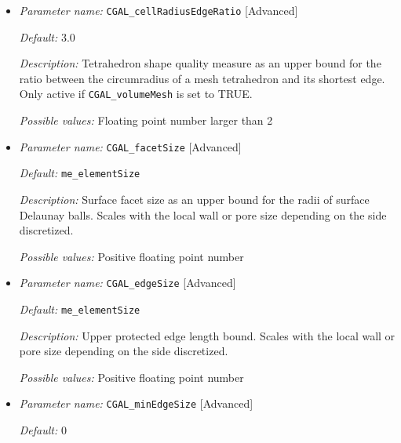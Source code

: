 \begin{itemize}[itemsep=0.8em, parsep=0.3em]
	\item {\it Parameter name:} {\tt CGAL\_cellRadiusEdgeRatio} \hfill [Advanced]
	\label{parameters:me_cellRadiusEdgeRatio}
	
	
	{\it Default:} 3.0
	
	{\it Description:} Tetrahedron shape quality measure as an upper bound for the ratio between the circumradius of a mesh tetrahedron and its shortest edge. Only active if {\tt  CGAL\_volumeMesh} is set to TRUE.
	
	{\it Possible values:} Floating point number larger than 2
	
	\item {\it Parameter name:} {\tt CGAL\_facetSize} \hfill [Advanced]
	\label{parameters:me_facetSize}
	
	
	{\it Default:} {\tt me\_elementSize}
	
	{\it Description:} Surface facet size as an upper bound for the radii of surface Delaunay balls. Scales with the local wall or pore size depending on the side discretized.
	
	{\it Possible values:} Positive floating point number
	
	\item {\it Parameter name:} {\tt CGAL\_edgeSize} \hfill [Advanced]
	\label{parameters:me_edgeSize}
	
	
	{\it Default:} {\tt me\_elementSize}

	{\it Description:} Upper protected edge length bound. Scales with the local wall or pore size depending on the side discretized.
	
	{\it Possible values:} Positive floating point number 

	\item {\it Parameter name:} {\tt CGAL\_minEdgeSize} \hfill [Advanced]
	\label{parameters:me_minEdgeSize}
	
	
	{\it Default:} 0
	

\end{itemize}
